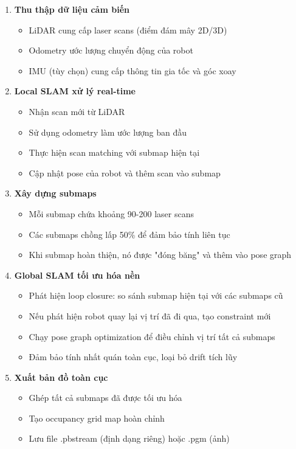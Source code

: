 \begin{enumerate}
    \item \textbf{Thu thập dữ liệu cảm biến}
    \begin{itemize}
        \item LiDAR cung cấp laser scans (điểm đám mây 2D/3D)
        \item Odometry ước lượng chuyển động của robot
        \item IMU (tùy chọn) cung cấp thông tin gia tốc và góc xoay
    \end{itemize}

    \item \textbf{Local SLAM xử lý real-time}
    \begin{itemize}
        \item Nhận scan mới từ LiDAR
        \item Sử dụng odometry làm ước lượng ban đầu
        \item Thực hiện scan matching với submap hiện tại
        \item Cập nhật pose của robot và thêm scan vào submap
    \end{itemize}

    \item \textbf{Xây dựng submaps}
    \begin{itemize}
        \item Mỗi submap chứa khoảng 90-200 laser scans
        \item Các submaps chồng lấp 50\% để đảm bảo tính liên tục
        \item Khi submap hoàn thiện, nó được "đóng băng" và thêm vào pose graph
    \end{itemize}

    \item \textbf{Global SLAM tối ưu hóa nền}
    \begin{itemize}
        \item Phát hiện loop closure: so sánh submap hiện tại với các submaps cũ
        \item Nếu phát hiện robot quay lại vị trí đã đi qua, tạo constraint mới
        \item Chạy pose graph optimization để điều chỉnh vị trí tất cả submaps
        \item Đảm bảo tính nhất quán toàn cục, loại bỏ drift tích lũy
    \end{itemize}

    \item \textbf{Xuất bản đồ toàn cục}
    \begin{itemize}
        \item Ghép tất cả submaps đã được tối ưu hóa
        \item Tạo occupancy grid map hoàn chỉnh
        \item Lưu file .pbstream (định dạng riêng) hoặc .pgm (ảnh)
    \end{itemize}
\end{enumerate}


